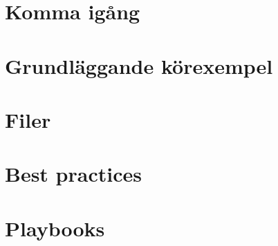 \pagestyle{plain}

\setcounter{page}{1}
\chapter{Komma igång}\label{sec:intro}


\chapter{Grundläggande körexempel}\label{sec:basicexamples}


\chapter{Filer}\label{sec:files}


\chapter{Best practices}\label{sec:bestpractices}


\chapter{Playbooks}\label{sec:playbooks}

